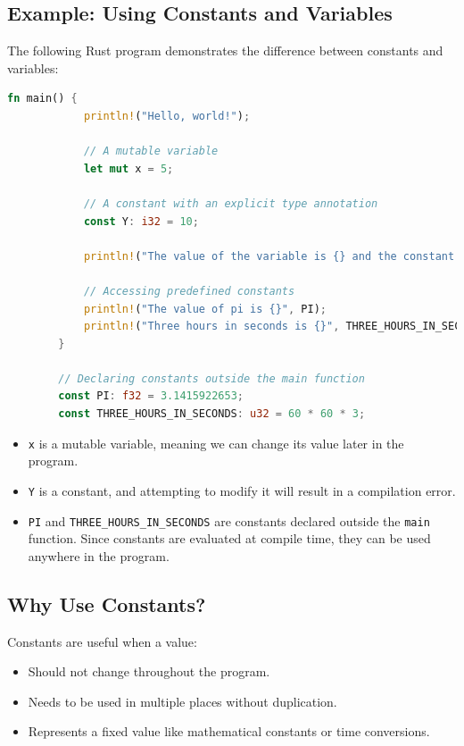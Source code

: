 \documentclass[a4paper,12pt]{report}
\begin{document}
	\subsection*{Example: Using Constants and Variables}
	The following Rust program demonstrates the difference between constants and variables:
	
	\begin{lstlisting}[language=Rust]
		fn main() {
			println!("Hello, world!");
			
			// A mutable variable
			let mut x = 5;
			
			// A constant with an explicit type annotation
			const Y: i32 = 10;
			
			println!("The value of the variable is {} and the constant is {}", x, Y);
			
			// Accessing predefined constants
			println!("The value of pi is {}", PI);
			println!("Three hours in seconds is {}", THREE_HOURS_IN_SECONDS);
		}
		
		// Declaring constants outside the main function
		const PI: f32 = 3.1415922653;
		const THREE_HOURS_IN_SECONDS: u32 = 60 * 60 * 3;
	\end{lstlisting}
	

	\begin{explanationbox}
		\begin{itemize}
		\item \texttt{x} is a mutable variable, meaning we can change its value later in the program.
		\item \texttt{Y} is a constant, and attempting to modify it will result in a compilation error.
		\item \texttt{PI} and \texttt{THREE\_HOURS\_IN\_SECONDS} are constants declared outside the \texttt{main} function. Since constants are evaluated at compile time, they can be used anywhere in the program.
	\end{itemize}
	\end{explanationbox}

	\subsection*{Why Use Constants?}
	Constants are useful when a value:
	\begin{itemize}
		\item Should not change throughout the program.
		\item Needs to be used in multiple places without duplication.
		\item Represents a fixed value like mathematical constants or time conversions.
	\end{itemize}
	
\end{document}
